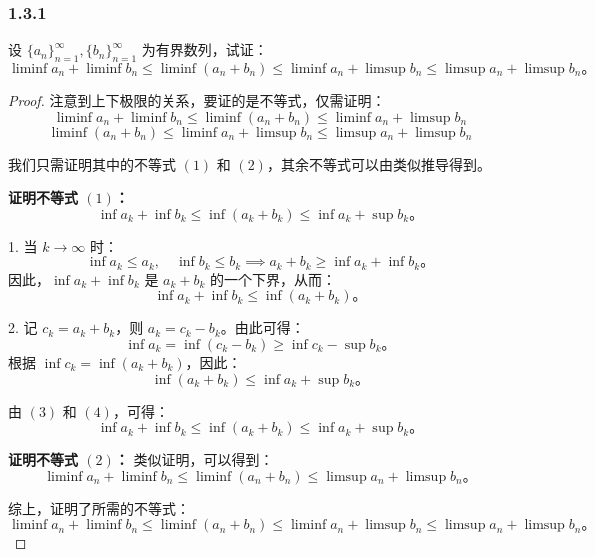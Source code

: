 \documentclass[12pt]{ctexart}
\begin{document}
\subsubsection*{1.3.1} 
设 $\{a_n\}_{n=1}^\infty, \{b_n\}_{n=1}^\infty$ 为有界数列，试证：
\[
\liminf a_n + \liminf b_n \leq \liminf (a_n + b_n) 
\leq \liminf a_n + \limsup b_n \leq \limsup a_n + \limsup b_n。
\]
\begin{proof}
注意到上下极限的关系，要证的是不等式，仅需证明：
\[
\liminf a_n + \liminf b_n \leq \liminf (a_n + b_n) 
\leq \liminf a_n + \limsup b_n \tag{1}
\]
\[
\liminf (a_n + b_n) 
\leq \liminf a_n + \limsup b_n \leq \limsup a_n + \limsup b_n \tag{2}
\]


我们只需证明其中的不等式 $(1)$ 和 $(2)$，其余不等式可以由类似推导得到。

\textbf{证明不等式 $(1)$：}
\[
\inf a_k + \inf b_k \leq \inf (a_k + b_k) \leq \inf a_k + \sup b_k。
\]

1. 当 $k \to \infty$ 时：
\[
\inf a_k \leq a_k, \quad \inf b_k \leq b_k \implies a_k + b_k \geq \inf a_k + \inf b_k。
\]
因此，$\inf a_k + \inf b_k$ 是 $a_k + b_k$ 的一个下界，从而：
\[
\inf a_k + \inf b_k \leq \inf (a_k + b_k)。 \tag{3}
\]

2. 记 $c_k = a_k + b_k$，则 $a_k = c_k - b_k$。由此可得：
\[
\inf a_k = \inf (c_k - b_k) \geq \inf c_k - \sup b_k。
\]
根据 $\inf c_k = \inf (a_k + b_k)$，因此：
\[
\inf (a_k + b_k) \leq \inf a_k + \sup b_k。 \tag{4}
\]

由 $(3)$ 和 $(4)$，可得：
\[
\inf a_k + \inf b_k \leq \inf (a_k + b_k) \leq \inf a_k + \sup b_k。 \tag{5}
\]

\textbf{证明不等式 $(2)$：} 类似证明，可以得到：
\[
\liminf a_n + \liminf b_n \leq \liminf (a_n + b_n) \leq \limsup a_n + \limsup b_n。
\]

综上，证明了所需的不等式：
\[
\liminf a_n + \liminf b_n \leq \liminf (a_n + b_n) \leq \liminf a_n + \limsup b_n \leq \limsup a_n + \limsup b_n。
\]
\end{proof}
\end{document}
